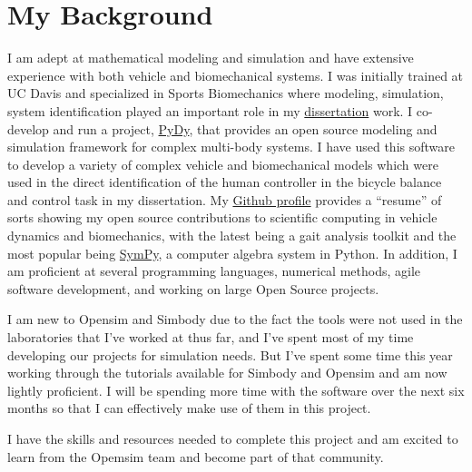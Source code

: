 \documentclass[11pt]{article}
\begin{document}
\section*{My Background}

I am adept at mathematical modeling and simulation and have extensive
experience with both vehicle and biomechanical systems. I was initially trained
at UC Davis and specialized in Sports Biomechanics where modeling, simulation,
system identification played an important role in my
\href{http://moorepants.github.io/dissertation}{dissertation} work. I
co-develop and run a project, \href{http://pydy.org}{PyDy}, that provides an
open source modeling and simulation framework for complex multi-body systems.
I have used this software to develop a variety of complex vehicle and
biomechanical models which were used in the direct identification of the human
controller in the bicycle balance and control task in my dissertation. My
\href{http://github.com/moorepants}{Github profile} provides a ``resume'' of
sorts showing my open source contributions to scientific computing in vehicle
dynamics and biomechanics, with the latest being a gait analysis toolkit and
the most popular being \href{http://www.sympy.org}{SymPy}, a computer algebra
system in Python. In addition, I am proficient at several programming
languages, numerical methods, agile software development, and working on large
Open Source projects.

I am new to Opensim and Simbody due to the fact the tools were not used in the
laboratories that I've worked at thus far, and I've spent most of my time
developing our projects for simulation needs. But I've spent some time this
year working through the tutorials available for Simbody and Opensim and am now
lightly proficient. I will be spending more time with the software over the
next six months so that I can effectively make use of them in this project.

I have the skills and resources needed to complete this project and am excited
to learn from the Opemsim team and become part of that community.



\end{document}
